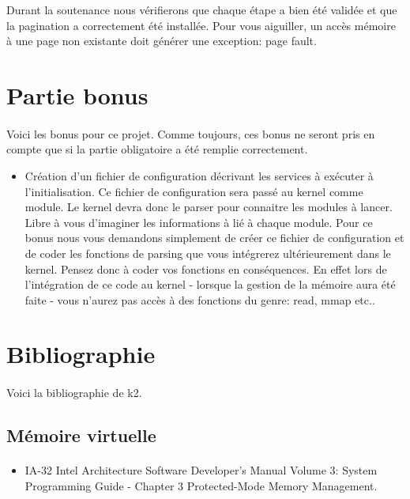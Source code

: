 \documentclass[10pt,a4wide]{article}
\begin{document}
Durant la soutenance nous v\'erifierons que chaque \'etape a bien \'et\'e
valid\'ee et que la pagination a correctement \'et\'e install\'ee. Pour vous
aiguiller, un acc\`es m\'emoire \`a une page non existante doit g\'en\'erer
une exception: page fault.

\section{Partie bonus}

\paragraph{}

Voici les bonus pour ce projet. Comme toujours, ces bonus ne seront pris
en compte que si la partie obligatoire a \'et\'e remplie correctement.

\begin{itemize}
\item Cr\'eation d'un fichier de configuration d\'ecrivant les services \`a
      ex\'ecuter \`a l'initialisation. Ce fichier de configuration
      sera pass\'e au kernel comme module. Le kernel devra donc le parser
      pour connaitre les modules \`a lancer. Libre \`a vous d'imaginer les
      informations \`a li\'e \`a chaque module. Pour ce bonus
      nous vous demandons simplement de cr\'eer ce fichier de configuration
      et de coder les fonctions de parsing que vous int\'egrerez
      ult\'erieurement dans le kernel. Pensez donc \`a coder vos fonctions
      en cons\'equences. En effet lors de l'int\'egration de ce code
      au kernel - lorsque la gestion de la m\'emoire aura \'et\'e faite -
      vous n'aurez pas acc\`es \`a des fonctions du genre: read, mmap etc..
\end{itemize}

\section{Bibliographie}

\paragraph{}

Voici la bibliographie de k2.

\subsection{M\'emoire virtuelle}

\paragraph{}

\begin{itemize}
\item IA-32 Intel Architecture Software Developer's Manual Volume 3:
      System Programming Guide - Chapter 3 Protected-Mode Memory Management.
\end{itemize}
\end{document}
